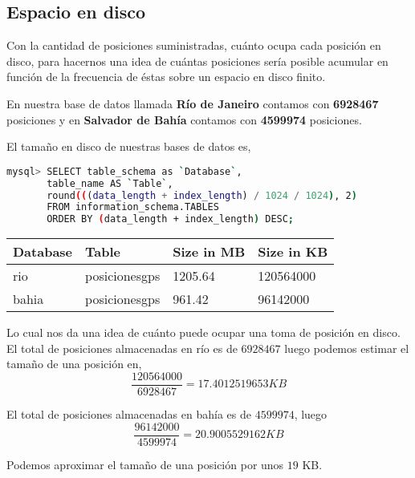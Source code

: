 \documentclass[a4paper, 12pt]{article}
\begin{document}
\pagebreak
\subsection{Espacio en disco}

Con la cantidad de posiciones suministradas, cu\'anto ocupa cada posici\'on en disco, para hacernos una idea de cu\'antas posiciones ser\'ia posible acumular en funci\'on de la frecuencia de \'estas sobre un espacio en disco finito.

En nuestra base de datos llamada \textbf{R\'io de Janeiro} contamos con \textbf{6928467} posiciones y en \textbf{Salvador de Bah\'ia} contamos con \textbf{4599974} posiciones.

El tama\~no en disco de nuestras bases de datos es,

\begin{lstlisting}[language=bash, basicstyle=\small]
mysql> SELECT table_schema as `Database`, 
	   table_name AS `Table`,  
	   round(((data_length + index_length) / 1024 / 1024), 2) 
	   FROM information_schema.TABLES  
	   ORDER BY (data_length + index_length) DESC;

\end{lstlisting}

\begin{center}

	\begin{tabular}{| l | l | l | l |}
	\hline
	Database & Table & Size in MB & Size in KB \\
	\hline
	rio & posicionesgps & 1205.64 & 120564000 \\
	bahia & posicionesgps & 961.42 & 96142000 \\
	\hline
	\end{tabular}
\end{center}

Lo cual nos da una idea de cu\'anto puede ocupar una toma de posici\'on en disco.\\

El total de posiciones almacenadas en r\'io es de $6928467$ luego podemos estimar el tama\~no de una posici\'on en, \\
$$\frac{120564000}{6928467} = 17.4012519653 KB$$

El total de posiciones almacenadas en bah\'ia es de $4599974$, luego\\
$$\frac{96142000}{4599974} = 20.9005529162 KB$$

Podemos aproximar el tama\~no de una posici\'on por unos $19$ KB. \\
\end{document}

